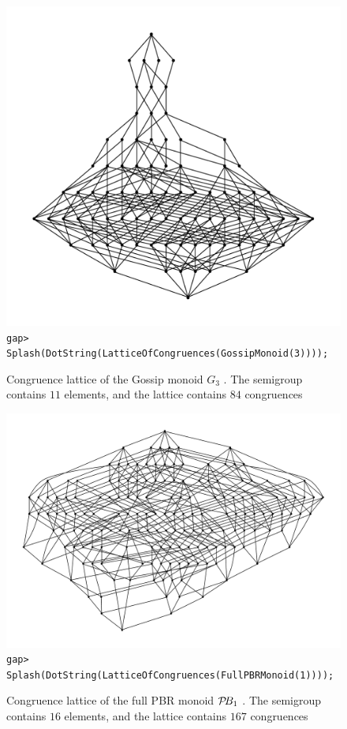 \begin{figure}[h]
  \centering
  \includegraphics[width=\textwidth]{pics/ch-lattice/gossip3.pdf}
  \texttt{gap> Splash(DotString(LatticeOfCongruences(GossipMonoid(3))));}
  \caption[Congruence lattice of the Gossip monoid $G_3$]
  {Congruence lattice of the Gossip monoid $G_3$ \cite[\S2]{gossip}.  The
    semigroup contains $11$ elements, and the lattice contains $84$ congruences}
  \label{fig:g3-lattice}
\end{figure}

\begin{figure}[h]
  \centering
  \includegraphics[width=\textwidth]{pics/ch-lattice/pbr1.pdf}
  \texttt{gap> Splash(DotString(LatticeOfCongruences(FullPBRMonoid(1))));}
  \caption[Congruence lattice of the full PBR monoid $\PBR_1$]
  {Congruence lattice of the full PBR monoid $\PBR_1$
    \cite[\S2.1]{diagram_semigroups}.  The semigroup contains $16$ elements, and
    the lattice contains $167$ congruences}
  \label{fig:pbr1-lattice}
\end{figure}

